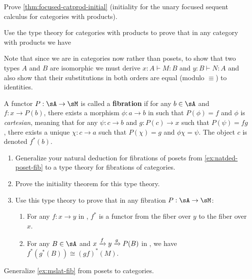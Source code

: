 \documentclass{book}
\let\types\vdash
\def\unit{\mathbf{1}}
\begin{document}
\begin{ex}\label{ex:focused-catprod-initial}
  Prove \cref{thm:focused-catprod-initial} (initiality for the unary focused sequent calculus for categories with products).
\end{ex}

\begin{ex}
  Use the type theory for categories with products to prove that in any category with products we have
  Note that since we are in categories now rather than posets, to show that two types $A$ and $B$ are isomorphic we must derive $x:A\types M:B$ and $y:B\types N:A$ and also show that their substitutions in both orders are equal (modulo $\equiv$) to identities.
\end{ex}

\begin{ex}\label{ex:catfib}
  A functor $P:\sA\to \sM$ is called a \textbf{fibration} if for any $b\in \sA$ and $f:x\to P(b)$, there exists a morphism $\phi:a\to b$ in \sA such that $P(\phi)=f$ and $\phi$ is \emph{cartesian}, meaning that for any $\psi:c\to b$ and $g:P(c)\to x$ such that $P(\psi)=fg$, there exists a unique $\chi:c\to a$ such that $P(\chi)=g$ and $\phi\chi=\psi$.
  The object $c$ is denoted $f^*(b)$.
  \begin{enumerate}
  \item Generalize your natural deduction for fibrations of posets from \cref{ex:natded-poset-fib} to a type theory for fibrations of categories.
  \item Prove the initiality theorem for this type theory.
  \item Use this type theory to prove that in any fibration $P:\sA\to\sM$:
    \begin{enumerate}
    \item For any $f:x\to y$ in \sM, $f^*$ is a functor from the fiber over $y$ to the fiber over $x$.
    \item For any $B\in \sA$ and $x\xrightarrow{f} y \xrightarrow{g} P(B)$ in \sM, we have $f^*(g^*(B)) \cong (gf)^*(M)$.
    \end{enumerate}
  \end{enumerate}
\end{ex}

\begin{ex}\label{ex:catprod-fib}
  Generalize \cref{ex:mslat-fib} from posets to categories.
\end{ex}
\end{document}

